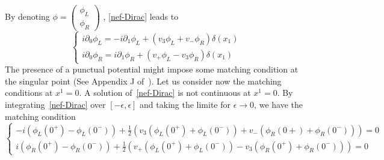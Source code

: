 By denoting $\phi =
\begin{pmatrix}
\phi_L \\
\phi_R
\end{pmatrix}$
, \cref{nef-Dirac} leads to
\begin{equation}
\begin{cases}
i \partial_0 \phi_L = -i\partial_1 \phi_L + (v_3 \phi_L + v_- \phi_R) \delta(x_1) \\
i \partial_0 \phi_R = i\partial_1 \phi_R + (v_+ \phi_L - v_3 \phi_R) \delta(x_1)
\end{cases}
\end{equation}
The presence of a punctual potential might impose some matching condition at the singular point (See \eg Appendix J of~\cite{albeverio1988solvable}).
Let us consider now the matching conditions at $x^1=0$.
A solution of~\cref{nef-Dirac} is not continuous at $x^1 = 0$. 
By integrating~\cref{nef-Dirac} over $[-\epsilon, \epsilon]$ and taking the limite for $\epsilon \rightarrow 0$,
we have the matching condition
\begin{equation}\label{nef-matching}
\begin{cases}
-i(\phi_L(0^+) - \phi_L(0^-)) + \frac{1}{2}(v_3 (\phi_L(0^+) + \phi_L(0^-))+ v_- (\phi_R(0+) + \phi_R(0^-))) = 0 \\
i(\phi_R(0^+) - \phi_R(0^-)) + \frac{1}{2}(v_+ (\phi_L(0^+) + \phi_L(0^-)) - v_3 (\phi_R(0^+) + \phi_R(0^-))) = 0
\end{cases}
\end{equation}
